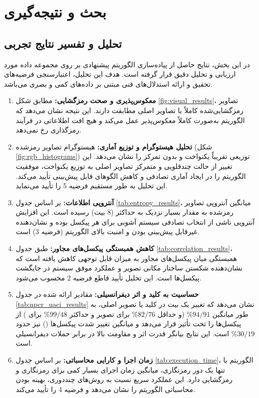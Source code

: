 
\chapter{بحث و نتیجه‌گیری}

\section{تحلیل و تفسیر نتایج تجربی}
در این بخش، نتایج حاصل از پیاده‌سازی الگوریتم پیشنهادی بر روی مجموعه داده  مورد ارزیابی و تحلیل دقیق قرار گرفته است. هدف این تحلیل، اعتبارسنجی فرضیه‌های تحقیق و ارائه استدلال‌های فنی مبتنی بر داده‌های کمی و بصری می‌باشد.

\begin{enumerate}
    \item \textbf{معکوس‌پذیری و صحت رمزگشایی:} مطابق شکل \ref{fig:visual_results}، تصاویر رمزگشایی‌شده کاملاً با تصاویر اصلی مطابقت دارند. این نتیجه نشان می‌دهد که الگوریتم به‌صورت کاملاً معکوس‌پذیر عمل می‌کند و هیچ افت اطلاعاتی در فرآیند رمزگذاری رخ نمی‌دهد.
    \item \textbf{تحلیل هیستوگرام و توزیع آماری:} هیستوگرام تصاویر رمزشده (شکل \ref{fig:rgb_histograms}) توزیعی تقریباً یکنواخت و بدون تمرکز را نشان می‌دهد. این تغییر از حالت چندقلویی و متمرکز تصاویر اصلی به توزیع یکنواخت، موفقیت الگوریتم را در ایجاد آماری تصادفی و کاهش الگوهای قابل پیش‌بینی تأیید می‌کند. این تحلیل به طور مستقیم فرضیه 5 را تأیید می‌نماید.
    \item \textbf{آنتروپی اطلاعات:} بر اساس جدول \ref{tab:entropy_results}، میانگین آنتروپی تصاویر رمزشده به مقدار بسیار نزدیک به حداکثر (8 بیت) رسیده است. این افزایش آنتروپی ناشی از انتخاب تصادفی سیستم آشوبی برای هر پیکسل بوده و نشان‌دهنده غیرقابل پیش‌بینی بودن و امنیت بالای الگوریتم (فرضیه 3) است.
    \item \textbf{کاهش همبستگی پیکسل‌های مجاور:} طبق جدول \ref{tab:correlation_results}، همبستگی میان پیکسل‌های مجاور به میزان قابل توجهی کاهش یافته است که نشان‌دهنده شکستن ساختار مکانی تصویر و عملکرد موفق سیستم  در جایگشت پیکسل‌ها است. این تحلیل تأیید قاطع فرضیه 2 محسوب می‌شود.
    \item \textbf{حساسیت به کلید و اثر دیفرانسیلی:} مقادیر ارائه شده در جدول \ref{tab:npcr_uaci_results} نشان می‌دهد که تغییر یک بیت در کلید یا تصویر اصلی، به طور میانگین $94/91$\% (و حداقل $82/76$\% برای تصویر  و حداکثر $99/48$\% برای ) از پیکسل‌ها را تحت تأثیر قرار می‌دهد و میانگین تغییر شدت پیکسل‌ها () نیز حدود $30/19$\% است. این نتایج بیانگر قدرت اثر  و مقاومت بالا در برابر حملات دیفرانسیلی است.
    \item \textbf{زمان اجرا و کارایی محاسباتی:} بر اساس جدول \ref{tab:execution_time}، الگوریتم با تنها یک دور رمزنگاری، میانگین زمان اجرای بسیار کمی برای رمزنگاری و رمزگشایی دارد. این عملکرد سریع نسبت به روش‌های چنددوری، بهینه بودن محاسباتی الگوریتم را نشان می‌دهد و فرضیه 4 را تأیید می‌کند.
\end{enumerate}

